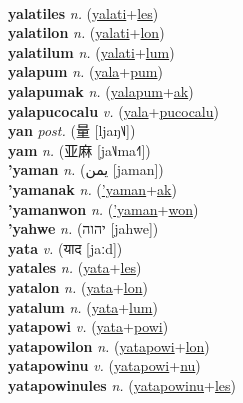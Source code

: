  \label{yalati} \\
\textbf{yalatiles} \textit{n.} (\hyperref[yalati]{yalati}+\hyperref[les]{les})
 \label{yalatiles} \\
\textbf{yalatilon} \textit{n.} (\hyperref[yalati]{yalati}+\hyperref[lon]{lon})
 \label{yalatilon} \\
\textbf{yalatilum} \textit{n.} (\hyperref[yalati]{yalati}+\hyperref[lum]{lum})
 \label{yalatilum} \\
\textbf{yalapum} \textit{n.} (\hyperref[yala]{yala}+\hyperref[pum]{pum})
 \label{yalapum} \\
\textbf{yalapumak} \textit{n.} (\hyperref[yalapum]{yalapum}+\hyperref[ak]{ak})
 \label{yalapumak} \\
\textbf{yalapucocalu} \textit{v.} (\hyperref[yala]{yala}+\hyperref[pucocalu]{pucocalu})
 \label{yalapucocalu} \\
\textbf{yan} \textit{post.} ({\chinese{}量} [ljaŋ˥˩])
 \label{yan} \\
\textbf{yam} \textit{n.} ({\chinese{}亚麻} [ja˥˩ma˧˥])
 \label{yam} \\
\textbf{'yaman} \textit{n.} ({\arabics{}يمن} [jaman])
 \label{'yaman} \\
\textbf{'yamanak} \textit{n.} (\hyperref['yaman]{'yaman}+\hyperref[ak]{ak})
 \label{'yamanak} \\
\textbf{'yamanwon} \textit{n.} (\hyperref['yaman]{'yaman}+\hyperref[won]{won})
 \label{'yamanwon} \\
\textbf{'yahwe} \textit{n.} ({\hebrew{}יהוה‬} [jahwe])
 \label{'yahwe} \\
\textbf{yata} \textit{v.} ({\devanagari{}याद} [jaːd])
 \label{yata} \\
\textbf{yatales} \textit{n.} (\hyperref[yata]{yata}+\hyperref[les]{les})
 \label{yatales} \\
\textbf{yatalon} \textit{n.} (\hyperref[yata]{yata}+\hyperref[lon]{lon})
 \label{yatalon} \\
\textbf{yatalum} \textit{n.} (\hyperref[yata]{yata}+\hyperref[lum]{lum})
 \label{yatalum} \\
\textbf{yatapowi} \textit{v.} (\hyperref[yata]{yata}+\hyperref[powi]{powi})
 \label{yatapowi} \\
\textbf{yatapowilon} \textit{n.} (\hyperref[yatapowi]{yatapowi}+\hyperref[lon]{lon})
 \label{yatapowilon} \\
\textbf{yatapowinu} \textit{v.} (\hyperref[yatapowi]{yatapowi}+\hyperref[nu]{nu})
 \label{yatapowinu} \\
\textbf{yatapowinules} \textit{n.} (\hyperref[yatapowinu]{yatapowinu}+\hyperref[les]{les})
